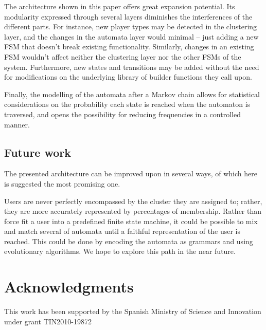 \documentclass[conference]{IEEEtran}
\begin{document}
The architecture shown in this paper offers great expansion potential. Its modularity expressed through several layers diminishes the interferences of the different parts. For instance, new player types may be detected in the clustering layer, and the changes in the automata layer would minimal -- just adding a new FSM that doesn't break existing functionality. Similarly, changes in an existing FSM wouldn't affect neither the clustering layer nor the other FSMs of the system. Furthermore, new states and transitions may be added without the need for modifications on the underlying library of builder functions they call upon.

Finally, the modelling of the automata after a Markov chain allows for statistical considerations on the probability each state is reached when the automaton is traversed, and opens the possibility for reducing frequencies in a controlled manner.

\subsection*{Future work}

The presented architecture can be improved upon in several ways, of which here is suggested the most promising one.

Users are never perfectly encompassed by the cluster they are assigned to; rather, they are more accurately represented by percentages of membership. Rather than force fit a user into a predefined finite state machine, it could be possible to mix and match several of automata until a faithful representation of the user is reached. This could be done by encoding the automata as grammars and using evolutionary algorithms. We hope to explore this path in the near future.

\section*{Acknowledgments}
This work has been supported by the
Spanish Ministry of Science and Innovation under grant
TIN2010-19872



%

%
\end{document}
